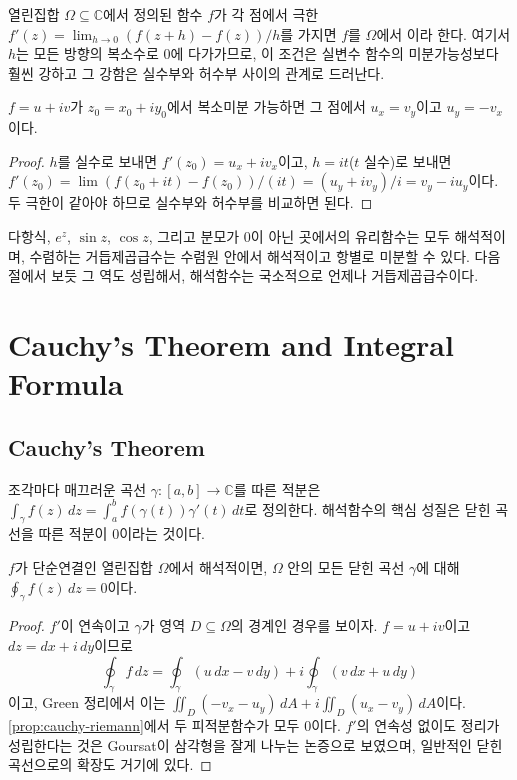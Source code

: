 열린집합 $\Omega\subseteq\mathbb{C}$에서 정의된 함수 $f$가 각 점에서 극한 $f'(z)=\lim_{h\to0}(f(z+h)-f(z))/h$를 가지면 $f$를 $\Omega$에서 이라 한다. 여기서 $h$는 모든 방향의 복소수로 $0$에 다가가므로, 이 조건은 실변수 함수의 미분가능성보다 훨씬 강하고 그 강함은 실수부와 허수부 사이의 관계로 드러난다.

\begin{proposition}
\label{prop:cauchy-riemann}
$f=u+iv$가 $z_0=x_0+iy_0$에서 복소미분 가능하면 그 점에서 $u_x=v_y$이고 $u_y=-v_x$이다.
\end{proposition}

\begin{proof}
$h$를 실수로 보내면 $f'(z_0)=u_x+iv_x$이고, $h=it$($t$ 실수)로 보내면 $f'(z_0)=\lim(f(z_0+it)-f(z_0))/(it)=(u_y+iv_y)/i=v_y-iu_y$이다. 두 극한이 같아야 하므로 실수부와 허수부를 비교하면 된다.
\end{proof}

다항식, $e^z$, $\sin z$, $\cos z$, 그리고 분모가 $0$이 아닌 곳에서의 유리함수는 모두 해석적이며, 수렴하는 거듭제곱급수는 수렴원 안에서 해석적이고 항별로 미분할 수 있다. 다음 절에서 보듯 그 역도 성립해서, 해석함수는 국소적으로 언제나 거듭제곱급수이다.

\section{Cauchy's Theorem and Integral Formula}
\label{sec:cauchy}

\subsection{Cauchy's Theorem}

조각마다 매끄러운 곡선 $\gamma:[a,b]\to\mathbb{C}$를 따른 적분은 $\int_\gamma f(z)\,dz=\int_a^bf(\gamma(t))\gamma'(t)\,dt$로 정의한다. 해석함수의 핵심 성질은 닫힌 곡선을 따른 적분이 $0$이라는 것이다.

\begin{theorem}[Cauchy]
\label{thm:cauchy}
$f$가 단순연결인 열린집합 $\Omega$에서 해석적이면, $\Omega$ 안의 모든 닫힌 곡선 $\gamma$에 대해 $\oint_\gamma f(z)\,dz=0$이다.
\end{theorem}

\begin{proof}
$f'$이 연속이고 $\gamma$가 영역 $D\subseteq\Omega$의 경계인 경우를 보이자. $f=u+iv$이고 $dz=dx+i\,dy$이므로
\[
\oint_\gamma f\,dz=\oint_\gamma(u\,dx-v\,dy)+i\oint_\gamma(v\,dx+u\,dy)
\]
이고, Green 정리에서 이는 $\iint_D(-v_x-u_y)\,dA+i\iint_D(u_x-v_y)\,dA$이다. \cref{prop:cauchy-riemann}에서 두 피적분함수가 모두 $0$이다. $f'$의 연속성 없이도 정리가 성립한다는 것은 Goursat이 삼각형을 잘게 나누는 논증으로 보였으며\cite{ahlfors1979complex,stein2003complex}, 일반적인 닫힌 곡선으로의 확장도 거기에 있다.
\end{proof}

